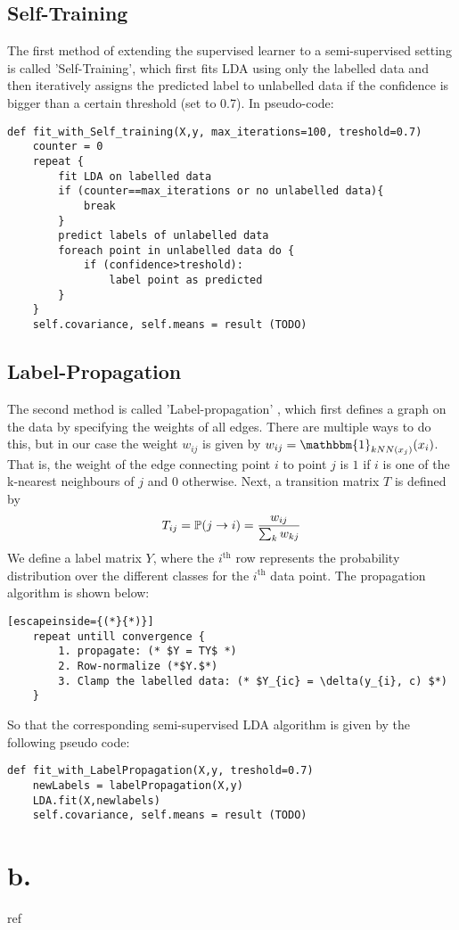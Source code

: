 \documentclass [a4paper] {report}
\begin{document}
	\subsection*{Self-Training}
	The first method of extending the supervised learner to a semi-supervised setting is called 'Self-Training', which first fits LDA using only the labelled data and then iteratively assigns the predicted label to unlabelled data if the confidence is bigger than a certain threshold (set to 0.7). In pseudo-code:
	
	\begin{lstlisting}
def fit_with_Self_training(X,y, max_iterations=100, treshold=0.7)
	counter = 0
	repeat {
		fit LDA on labelled data
		if (counter==max_iterations or no unlabelled data){
			break
		}
		predict labels of unlabelled data
		foreach point in unlabelled data do {
			if (confidence>treshold):
				label point as predicted
		}		
	}
	self.covariance, self.means = result (TODO)
	\end{lstlisting}
	\subsection*{Label-Propagation}
	The second method is called 'Label-propagation' \citep{propagation}, which first defines a graph on the data by specifying the weights of all edges. There are multiple ways to do this, but in our case the weight $w_{ij}$ is given by $w_{ij} = \mathbbm{1}_{kNN(x_{j})}(x_{i})$. That is, the weight of the edge connecting point $i$ to point $j$ is $1$ if $i$ is one of the k-nearest neighbours of $j$ and $0$ otherwise. Next, a transition matrix $T$ is defined by 
	$$T_{ij} = \mathbb{P}(j \to i) = {w_{ij} \over \sum_{k} w_{kj} } $$
	We define a label matrix $Y$, where the $i^{\text{th}}$ row represents the probability distribution over the different classes for the $i^{\text{th}}$ data point. The propagation algorithm is shown below:
	\begin{lstlisting}[escapeinside={(*}{*)}]
	repeat untill convergence {
		1. propagate: (* $Y = TY$ *)
		2. Row-normalize (*$Y.$*)
		3. Clamp the labelled data: (* $Y_{ic} = \delta(y_{i}, c) $*)	
	}
	\end{lstlisting}
	So that the corresponding semi-supervised LDA algorithm is given by the following pseudo code:
	\begin{lstlisting}
def fit_with_LabelPropagation(X,y, treshold=0.7)
	newLabels = labelPropagation(X,y)
	LDA.fit(X,newlabels)
	self.covariance, self.means = result (TODO)
	\end{lstlisting}
	
	\section*{b.}
	
	
	
	 
	
	\begin{bibliography}{ref}
		
	\end{bibliography}
\end{document}

